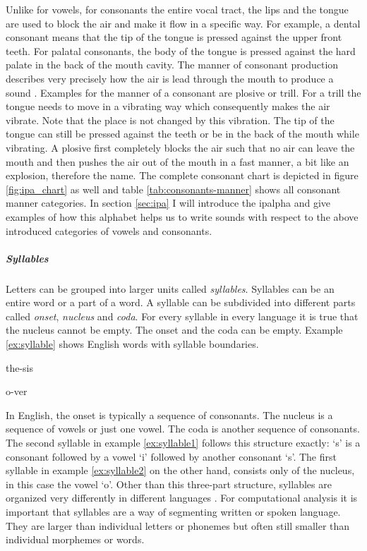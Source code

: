 Unlike for vowels, for consonants the entire vocal tract, the lips and the tongue are used to block the air and make it flow in a specific way. For example, a dental consonant means that the tip of the tongue is pressed against the upper front teeth. For palatal consonants, the body of the tongue is pressed against the hard palate in the back of the mouth cavity.  
The manner of consonant production describes very precisely how the air is lead through the mouth to produce a sound \citep{phonetics-video}. Examples for the manner of a consonant are plosive or trill. For a trill the tongue needs to move in a vibrating way which consequently makes the air vibrate. Note that the place is not changed by this vibration. The tip of the tongue can still be pressed against the teeth or be in the back of the mouth while vibrating. A plosive first completely blocks the air such that no air can leave the mouth and then pushes the air out of the mouth in a fast manner, a bit like an explosion, therefore the name. The complete consonant chart is depicted in figure \ref{fig:ipa_chart} as well and table \ref{tab:consonants-manner} shows all consonant manner categories. In section \ref{sec:ipa} I will introduce the \ac{ipalpha} and give examples of how this alphabet helps us to write sounds with respect to the above introduced categories of vowels and consonants. 

\subparagraph{Syllables} Letters can be grouped into larger units called \textit{syllables}. Syllables can be an entire word or a part of a word. A syllable can be subdivided into different parts called \textit{onset}, \textit{nucleus} and \textit{coda}. For every syllable in every language it is true that the nucleus cannot be empty. The onset and the coda can be empty. Example \ref{ex:syllable} shows English words with syllable boundaries.
\begin{covsubexamples}[preamble={English syllables: the hyphen denotes a syllable boundary.}]
\label{ex:syllable}
\item \label{ex:syllable1} the-sis
\item \label{ex:syllable2} o-ver
\end{covsubexamples}
In English, the onset is typically a sequence of consonants. The nucleus is a sequence of vowels or just one vowel. The coda is another sequence of consonants. The second syllable in example \ref{ex:syllable1} follows this structure exactly: `s' is a consonant followed by a vowel `i' followed by another consonant `s'. The first syllable in example \ref{ex:syllable2} on the other hand, consists only of the nucleus, in this case the vowel `o'. Other than this three-part structure, syllables are organized very differently in different languages \citep{Intro.2007}. For computational analysis it is important that syllables are a way of segmenting written or spoken language. They are larger than individual letters or phonemes but often still smaller than individual morphemes or words. 

